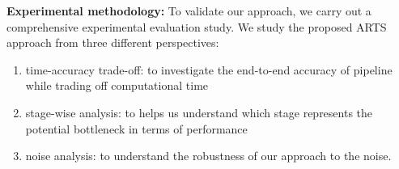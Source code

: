 
\textbf{Experimental methodology:}
To validate our approach, we carry out a comprehensive experimental evaluation study. We study the proposed ARTS approach from three different perspectives: 

\begin{enumerate}
\item time-accuracy trade-off: to investigate the end-to-end accuracy of pipeline while trading off computational time
\item stage-wise analysis: to helps us understand which stage represents the potential bottleneck in terms of performance
\item noise analysis: to understand the robustness of our approach to the noise.
\end{enumerate}

\vspace{5pt}
